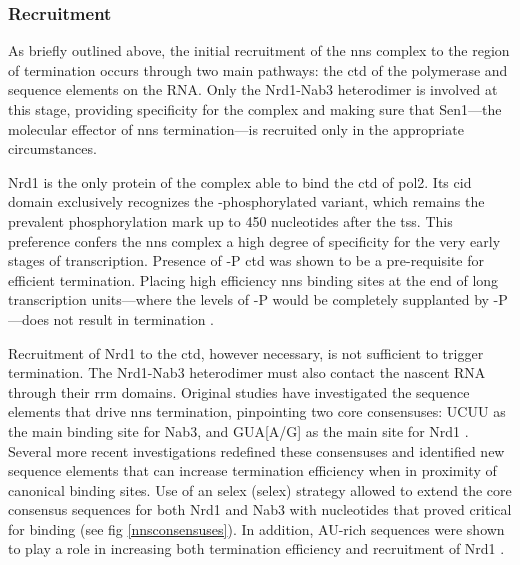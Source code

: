 \subsubsection{Recruitment}

As briefly outlined above, the initial recruitment of the \gls{nns} complex to the region of termination occurs through two main pathways: the \gls{ctd} of the polymerase and sequence elements on the RNA.
Only the Nrd1-Nab3 heterodimer is involved at this stage, providing specificity for the complex and making sure that Sen1---the molecular effector of \gls{nns} termination---is recruited only in the appropriate circumstances.

Nrd1 is the only protein of the complex able to bind the \gls{ctd} of \gls{pol2}.
Its \gls{cid} domain exclusively recognizes the \serf{}-phosphorylated variant, which remains the prevalent phosphorylation mark up to 450 nucleotides after the \gls{tss}.
This preference confers the \gls{nns} complex a high degree of specificity for the very early stages of transcription.
Presence of \serf{}-P \gls{ctd} was shown to be a pre-requisite for efficient termination.
Placing high efficiency \gls{nns} binding sites at the end of long transcription units---where the levels of \serf{}-P would be completely supplanted by \sert{}-P---does not result in termination \cite{gudipati:2008:phosphorylation}.

Recruitment of Nrd1 to the \gls{ctd}, however necessary, is not sufficient to trigger termination.
The Nrd1-Nab3 heterodimer must also contact the nascent RNA through their \gls{rrm} domains.
Original studies have investigated the sequence elements that drive \gls{nns} termination, pinpointing two core consensuses: UCUU as the main binding site for Nab3, and GUA[A/G] as the main site for Nrd1 \cite{carroll:2004:identification}.
Several more recent investigations redefined these consensuses and identified new sequence elements that can increase termination efficiency when in proximity of canonical binding sites.
Use of an \invivo{} \gls{selex} (\glsdesc{selex}) strategy allowed to extend the core consensus sequences for both Nrd1 and Nab3 with nucleotides that proved critical for binding (see fig \ref{nnsconsensuses}).
In addition, AU-rich sequences were shown to play a role in increasing both termination efficiency and recruitment of Nrd1 \citep{porrua:2012:in}.

